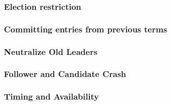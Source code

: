   \subsubsection{Election restriction}
  \subsubsection{Committing entries from previous terms}
  \subsubsection{Neutralize Old Leaders}
  \subsubsection{Follower and Candidate Crash}
  \subsubsection{Timing and Availability}